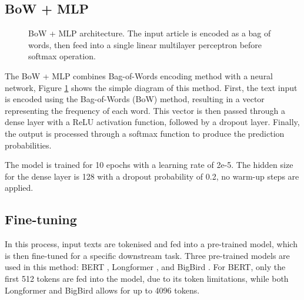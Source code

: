 \subsection{BoW + MLP}

\begin{figure}[htbp]
    \centering
    \caption{BoW + MLP architecture. The input article is encoded as a bag of words, then feed into a single linear multilayer perceptron before softmax operation.}
    \label{fig:bow_mlp_architecture}
\end{figure}

The BoW + MLP combines Bag-of-Words encoding method with a neural network, Figure \ref{fig:bow_mlp_architecture} shows the simple diagram of this method. First, the text input is encoded using the Bag-of-Words (BoW) method, resulting in a vector representing the frequency of each word. This vector is then passed through a dense layer with a ReLU activation function, followed by a dropout layer. Finally, the output is processed through a softmax function to produce the prediction probabilities. 

The model is trained for 10 epochs with a learning rate of 2e-5. The hidden size for the dense layer is 128 with a dropout probability of 0.2, no warm-up steps are applied.

\subsection{Fine-tuning}

In this process, input texts are tokenised and fed into a pre-trained model, which is then fine-tuned for a specific downstream task. Three pre-trained models are used in this method: BERT \cite{devlin-2019-bert}, Longformer \cite{beltagy-2020-longformer}, and BigBird \cite{zaheer-2021-bigbird}. For BERT, only the first 512 tokens are fed into the model, due to its token limitations, while both Longformer and BigBird allows for up to 4096 tokens. 

